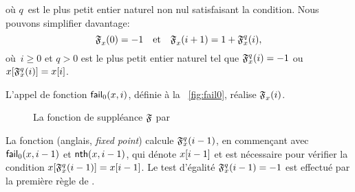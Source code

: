 où \(q\)~est le plus petit entier naturel non nul satisfaisant la
condition. Nous pouvons simplifier davantage:
\begin{equation*}
\mathfrak{F}_{x}^{}(0) = -1
\quad \text{et} \quad
\mathfrak{F}_{x}^{}(i+1) = 1 + \mathfrak{F}_{x}^{q}(i),
\end{equation*}
où~\(i \geqslant 0\) et \(q>0\) est le plus petit entier naturel tel
que \(\mathfrak{F}_{x}^{q}(i) = -1\) ou
\(\smash{{x}[{\mathfrak{F}_{x}^{q}(i)}]} = {x}[{i}]\).


L'appel de fonction
\(\textsf{fail}_0(x,i)\), définie à la
\fig~\vref{fig:fail0}, réalise \(\mathfrak{F}_{x}^{}(i)\).
\begin{figure}[t]
\abovedisplayskip=0pt
\belowdisplayskip=0pt
\caption{La fonction de suppléance \(\mathfrak{F}\) par }
\label{fig:fail0}
\end{figure}
La fonction  (anglais, \emph{fixed
  point}) calcule \(\mathfrak{F}_{x}^{q}(i-1)\), en commençant avec
\(\textsf{fail}_0(x,i-1)\) et
\(\textsf{nth}(x,i-1)\), qui dénote
\({x}[{i-1}]\) et est nécessaire pour vérifier la condition
\(\smash{{x}[{\mathfrak{F}_{x}^{q}(i-1)}]} = {x}[{i-1}]\). Le test
d'égalité \(\mathfrak{F}_{x}^{q}(i-1) = -1\) est effectué par la première
règle de .

